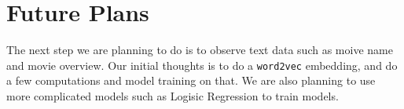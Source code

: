\documentclass[12pt]{article}
\begin{document}
\section{Future Plans}
The next step we are planning to do is to observe text data such as moive name and movie overview. Our initial thoughts is to do a \texttt{word2vec} embedding, and do a few computations and model training on that. We are also planning to use more complicated models such as Logisic Regression to train models.
\end{document}
